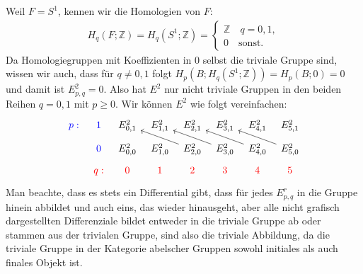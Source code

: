 \documentclass[12pt]{article}
\numberwithin{conj}{section}
\begin{document}
                    Weil $F = S^1$, kennen wir die Homologien von $F$:
                    \begin{align}
                        H_q(F;\mathbb{Z}) = H_q(S^1;\mathbb{Z}) = \begin{cases}
                        \mathbb{Z} \quad q = 0,1, \\
                        0 \quad \text{sonst.}
                        \end{cases}
                    \end{align}
                    Da Homologiegruppen mit Koeffizienten in $0$ selbst die triviale Gruppe sind, wissen wir auch, dass für $q \neq 0,1$ folgt $H_p(B;H_q(S^1;\mathbb{Z})) = H_p(B;0) = 0$ und damit ist $E^2_{p,q}=0$. Also hat $E^2$ nur nicht triviale Gruppen in den beiden Reihen $q = 0,1$ mit $p \geq 0$. Wir können $E^2$ wie folgt vereinfachen:
                    \[\begin{tikzcd}[sep=tiny]
                        {\color{blue}p:} & {\color{blue}1} & {E^2_{0,1}} & {E^2_{1,1}} & {E^2_{2,1}} & {E^2_{3,1}} & {E^2_{4,1}} & {E^2_{5,1}} \\
                        & {\color{blue}0} & {E^2_{0,0}} & {E^2_{1,0}} & {E^2_{2,0}} & {E^2_{3,0}} & {E^2_{4,0}} & {E^2_{5,0}} \\
                        & {\color{red}q:} & {\color{red}0} & {\color{red}1} & {\color{red}2} & {\color{red}3} & {\color{red}4} & {\color{red}5}
                        \arrow[from=2-5, to=1-3]
                        \arrow[from=2-6, to=1-4]
                        \arrow[from=2-7, to=1-5]
                        \arrow[from=2-8, to=1-6]
                    \end{tikzcd}\]
                    Man beachte, dass es stets ein Differential gibt, dass für jedes $E^r_{p,q}$ in die Gruppe hinein abbildet und auch eins, das wieder hinausgeht, aber alle nicht grafisch dargestellten Differenziale bildet entweder in die triviale Gruppe ab oder stammen aus der trivialen Gruppe, sind also die triviale Abbildung, da die triviale Gruppe in der Kategorie abelscher Gruppen sowohl initiales als auch finales Objekt ist.
\end{document}
